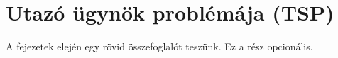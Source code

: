 \chapter{Utazó ügynök problémája (TSP)}\label{ch:ALAP}

\begin{osszefoglal}
	A fejezetek elején egy rövid összefoglalót teszünk. Ez a rész opcionális.
	
\end{osszefoglal}

